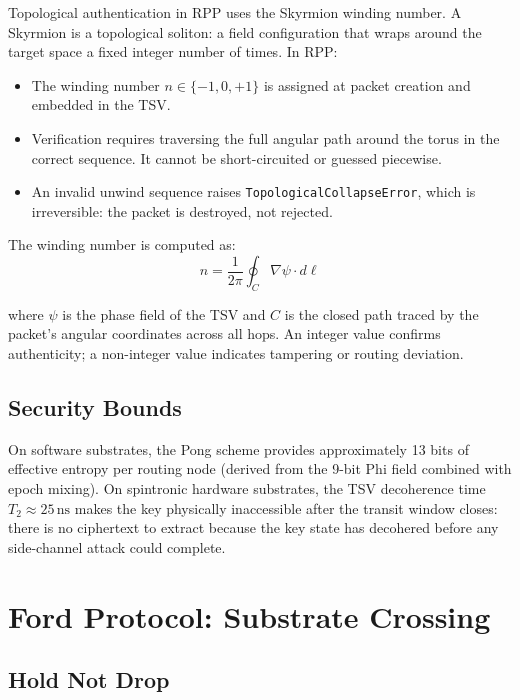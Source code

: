 \documentclass[11pt,a4paper]{article}
\begin{document}
Topological authentication in RPP uses the Skyrmion winding number. A Skyrmion is a topological soliton: a field configuration that wraps around the target space a fixed integer number of times. In RPP:

\begin{itemize}
    \item The winding number $n \in \{-1, 0, +1\}$ is assigned at packet creation and embedded in the TSV.
    \item Verification requires traversing the full angular path around the torus in the correct sequence. It cannot be short-circuited or guessed piecewise.
    \item An invalid unwind sequence raises \texttt{TopologicalCollapseError}, which is irreversible: the packet is destroyed, not rejected.
\end{itemize}

The winding number is computed as:
\begin{equation}
n = \frac{1}{2\pi} \oint_C \nabla \psi \cdot d\ell
\end{equation}

where $\psi$ is the phase field of the TSV and $C$ is the closed path traced by the packet's angular coordinates across all hops. An integer value confirms authenticity; a non-integer value indicates tampering or routing deviation.

\subsection{Security Bounds}

On software substrates, the Pong scheme provides approximately 13 bits of effective entropy per routing node (derived from the 9-bit Phi field combined with epoch mixing). On spintronic hardware substrates, the TSV decoherence time $T_2 \approx 25\,\text{ns}$ makes the key physically inaccessible after the transit window closes: there is no ciphertext to extract because the key state has decohered before any side-channel attack could complete.

\section{Ford Protocol: Substrate Crossing}

\subsection{Hold Not Drop}
\end{document}
